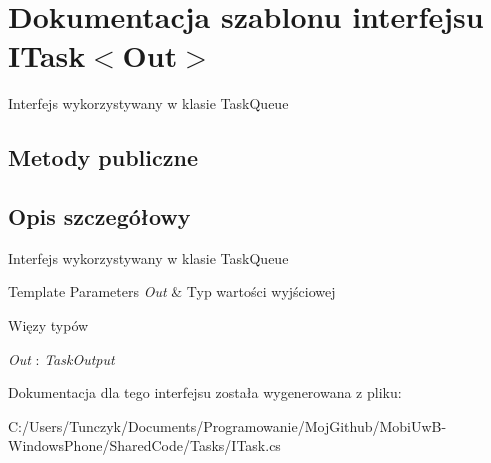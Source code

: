 \hypertarget{a00032}{}\section{Dokumentacja szablonu interfejsu I\+Task$<$Out$>$}
\label{a00032}


Interfejs wykorzystywany w klasie Task\+Queue  


\subsection*{Metody publiczne}


\subsection{Opis szczegółowy}
Interfejs wykorzystywany w klasie Task\+Queue 


\begin{DoxyTemplParams}{Template Parameters}
{\em Out} & Typ wartości wyjściowej\\
\hline
\end{DoxyTemplParams}
\begin{Desc}
\item[Więzy typów]\begin{description}
\item[{\em Out} : {\em Task\+Output}]\end{description}
\end{Desc}


Dokumentacja dla tego interfejsu została wygenerowana z pliku\+:\begin{DoxyCompactItemize}
\item 
C\+:/\+Users/\+Tunczyk/\+Documents/\+Programowanie/\+Moj\+Github/\+Mobi\+Uw\+B-\/\+Windows\+Phone/\+Shared\+Code/\+Tasks/I\+Task.\+cs\end{DoxyCompactItemize}
